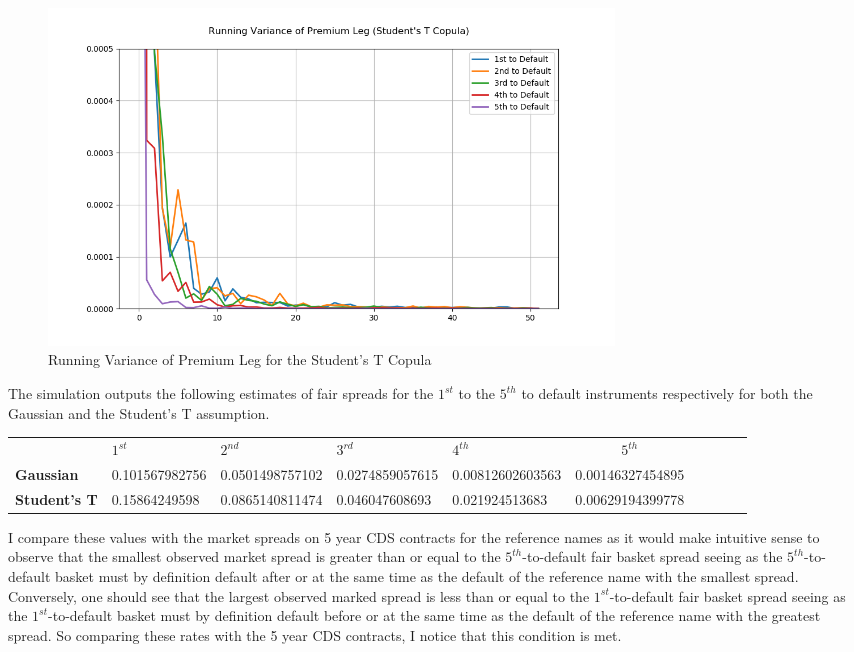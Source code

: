 \documentclass{report}
\theoremstyle{plain}
\theoremstyle{definition}
\begin{document}
\begin{figure}[H]
	\begin{center}
		\includegraphics[width=15cm]{Running_Variance_of_Premium_Leg_(Student's_T_Copula).png}
		\caption{Running Variance of Premium Leg for the Student's T Copula} 
		\label{Running_Variance_of_Premium_Leg_(Student's_T_Copula)}
	\end{center}
\end{figure}


The simulation outputs the following estimates of fair spreads for the $1^{st}$ to the $5^{th}$ to default instruments respectively for both the Gaussian and the Student's T assumption.

\begin{center}
	\begin{tabular}{|l|l|l|l|l|c|c|c|c|c|}
		\hline
		\textbf{} & \textbf{$1^{st}$} & \textbf{$2^{nd}$} & \textbf{$3^{rd}$} & \textbf{$4^{th}$} & \textbf{$5^{th}$}\\\hhline{|=|=|=|=|=|=|}
		\textbf{Gaussian} & 0.101567982756 & 0.0501498757102 & 0.0274859057615 & 0.00812602603563 & 0.00146327454895\\
		\textbf{Student's T} & 0.15864249598 & 0.0865140811474 & 0.046047608693 & 0.021924513683 & 0.00629194399778\\
		\hline
	\end{tabular}
\end{center}


I compare these values with the market spreads on 5 year CDS contracts for the reference names as it would make intuitive sense to observe that the smallest observed market spread is greater than or equal to the $5^{th}$-to-default fair basket spread seeing as the $5^{th}$-to-default basket must by definition default after or at the same time as the default of the reference name with the smallest spread. Conversely, one should see that the largest observed marked spread is less than or equal to the $1^{st}$-to-default fair basket spread seeing as the $1^{st}$-to-default basket must by definition default before or at the same time as the default of the reference name with the greatest spread. So comparing these rates with the 5 year CDS contracts, I notice that this condition is met.\\
\end{document}
